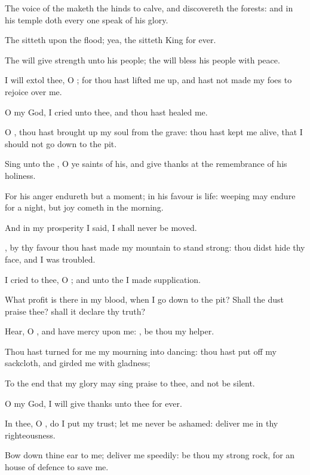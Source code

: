 \Verse The voice of the \LORD maketh the hinds to calve, and discovereth the forests: and in his temple doth every one speak of his glory.

\Verse The \LORD sitteth upon the flood; yea, the \LORD sitteth King for ever.

\Verse The \LORD will give strength unto his people; the \LORD will bless his people with peace.




\Chapter
\Verse I will extol thee, O \LORD; for thou hast lifted me up, and hast not made my foes to rejoice over me.

\Verse O \LORD my God, I cried unto thee, and thou hast healed me.

\Verse O \LORD, thou hast brought up my soul from the grave: thou hast kept me alive, that I should not go down to the pit.

\Verse Sing unto the \LORD, O ye saints of his, and give thanks at the remembrance of his holiness.

\Verse For his anger endureth but a moment; in his favour is life: weeping may endure for a night, but joy cometh in the morning.

\Verse And in my prosperity I said, I shall never be moved.

\Verse \LORD, by thy favour thou hast made my mountain to stand strong: thou didst hide thy face, and I was troubled.

\Verse I cried to thee, O \LORD; and unto the \LORD I made supplication.

\Verse What profit is there in my blood, when I go down to the pit?  Shall the dust praise thee? shall it declare thy truth?

\Verse Hear, O \LORD, and have mercy upon me: \LORD, be thou my helper.

\Verse Thou hast turned for me my mourning into dancing: thou hast put off my sackcloth, and girded me with gladness;

\Verse To the end that my glory may sing praise to thee, and not be silent.

O \LORD my God, I will give thanks unto thee for ever.




\Chapter
\Verse In thee, O \LORD, do I put my trust; let me never be ashamed: deliver me in thy righteousness.

\Verse Bow down thine ear to me; deliver me speedily: be thou my strong rock, for an house of defence to save me.

